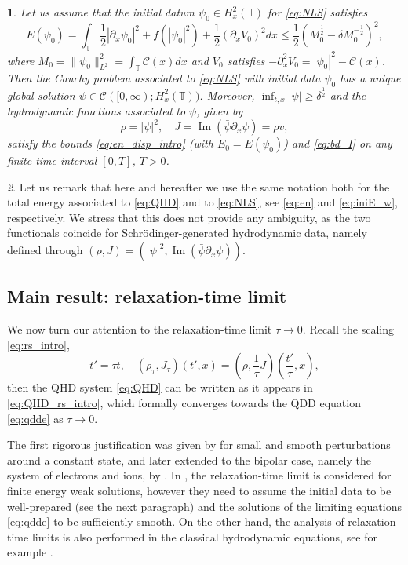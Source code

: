 \documentclass[leqno]{amsart}
\theoremstyle{plain}
\newtheorem{thm}{\protect\theoremname}
\theoremstyle{definition}
\theoremstyle{remark}
\newtheorem{rem}[thm]{\protect\remarkname}
\theoremstyle{plain}
\theoremstyle{plain}
\providecommand{\remarkname}{Remark}
\providecommand{\theoremname}{Theorem}
\def\T{{\mathbb T}}%
\def\d{{\partial}}
\DeclareMathOperator{\IM}{Im}
\numberwithin{equation}{section}
\begin{document}
\begin{thm}\label{thm:NLS}
Let us assume that the initial datum $\psi_0\in H^2_x(\T)$ for \eqref{eq:NLS} satisfies 
\begin{equation}\label{eq:iniE_w}
    E(\psi_0)=\int_\T \frac12|\d_x\psi_0|^2+f(|\psi_0|^2)+\frac12(\d_x V_0)^2dx \leq \frac12(M_0^\frac12-\delta M_0^{-\frac12})^2,
\end{equation}
where $M_0=\|\psi_0\|_{L^2}^2=\int_\T \mathcal{C}(x)dx$ and $V_0$ satisfies $-\d_x^2 V_0=|\psi_0|^2-\mathcal{C}(x)$. Then the Cauchy problem associated to \eqref{eq:NLS} with initial data $\psi_0$ has a unique global solution $\psi\in \mathcal{C}([0,\infty);H^2_x(\T))$. Moreover, $\inf_{t,x}|\psi|\geq \delta^\frac12$ and the hydrodynamic functions associated to $\psi$, given by
\[
\rho=|\psi|^2,\quad J=\IM(\bar\psi\d_x\psi)=\rho v,
\]
satisfy the bounds \eqref{eq:en_disp_intro} (with $E_0=E(\psi_0)$) and \eqref{eq:bd_I} on any finite time interval $[0,T]$, $T>0$.
\end{thm}
\begin{rem}
Let us remark that here and hereafter we use the same notation both for the total energy associated to \eqref{eq:QHD} and to \eqref{eq:NLS}, see \eqref{eq:en} and \eqref{eq:iniE_w}, respectively. We stress that this does not provide any ambiguity, as the two functionals coincide for Schr\"odinger-generated hydrodynamic data, namely defined through $(\rho, J)=(|\psi|^2, \IM(\bar\psi\d_x\psi))$.
\end{rem}

\subsection{Main result: relaxation-time limit}


We now turn our attention to the relaxation-time limit $\tau\to 0$. Recall the scaling \eqref{eq:rs_intro},
\begin{equation}\label{eq:rs_intro_1}
t'=\tau t,\quad (\rho_\tau,J_\tau)(t',x)=\left(\rho,\frac{1}{\tau}J\right)\left(\frac{t'}{\tau},x\right),
\end{equation}
then the QHD system \eqref{eq:QHD} can be written as it appears in \eqref{eq:QHD_rs_intro}, which formally converges towards the QDD equation \eqref{eq:qdde} as $\tau\to 0$.

The first rigorous justification was given by \cite{JLM} for small and smooth perturbations around a constant state, and later extended to the bipolar case, namely the system of electrons and ions, by \cite{LZZ}. In \cite{LT}, the relaxation-time limit is considered for finite energy weak solutions, however they need to assume the initial data to be well-prepared (see the next paragraph) and the solutions of the limiting equations \eqref{eq:qdde} to be sufficiently smooth. On the other hand, the analysis of relaxation-time limits is also performed in the classical hydrodynamic equations, see for example \cite{HL,HP,JP}.
\end{document}
